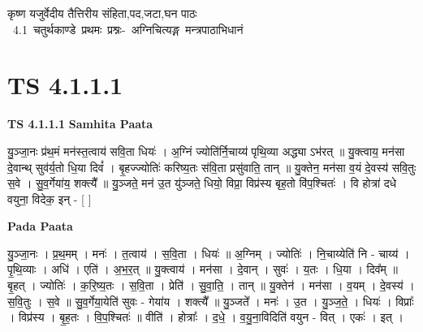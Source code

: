 \documentclass[17pt]{extarticle}
\begin{document}
\begin{titlepage}
    \begin{center}
 
\begin{sanskrit}
    { \Large
    कृष्ण यजुर्वेदीय तैत्तिरीय संहिता,पद,जटा,घन पाठः 
    }
    \\
    \vspace{2.5cm}
    \mbox{ \Large
    4.1     चतुर्थकाण्डे प्रथमः प्रश्नः- अग्निचित्यङ्ग मन्त्रपाठाभिधानं   }
\end{sanskrit}
\end{center}

\end{titlepage}
\tableofcontents
{}
\pagebreak


\section{ TS 4.1.1.1 }

\textbf{TS 4.1.1.1 } \newline
\textbf{Samhita Paata} \newline

यु॒ञ्जा॒नः प्र॑थ॒मं मन॑स्त॒त्वाय॑ सवि॒ता धियः॑ । अ॒ग्निं ज्योति॑र्नि॒चाय्य॑ पृथि॒व्या अद्ध्या ऽभ॑रत् ॥ यु॒क्त्वाय॒ मन॑सा दे॒वान्थ् सुव॑र्य॒तो धि॒या दिवं᳚ । बृ॒हज्ज्योतिः॑ करिष्य॒तः स॑वि॒ता प्रसु॑वाति॒ तान् ॥ यु॒क्तेन॒ मन॑सा व॒यं दे॒वस्य॑ सवि॒तुः स॒वे । सु॒व॒र्गेया॑य॒ शक्त्यै᳚ ॥ यु॒ञ्जते॒ मन॑ उ॒त यु॑ञ्जते॒ धियो॒ विप्रा॒ विप्र॑स्य बृह॒तो वि॑प॒श्चितः॑ । वि होत्रा॑ दधे वयुना॒ विदेक॒ इन् - [  ] \newline

\textbf{Pada Paata} \newline

यु॒ञ्जा॒नः । प्र॒थ॒मम् । मनः॑ । त॒त्वाय॑ । स॒वि॒ता । धियः॑ ॥ अ॒ग्निम् । ज्योतिः॑ । नि॒चाय्येति॑ नि - चाय्य॑ । पृ॒थि॒व्याः । अधि॑ । एति॑ । अ॒भ॒र॒त् ॥ यु॒क्त्वाय॑ । मन॑सा । दे॒वान् । सुवः॑ । य॒तः । धि॒या । दिव᳚म् ॥ बृ॒हत् । ज्योतिः॑ । क॒रि॒ष्य॒तः । स॒वि॒ता । प्रेति॑ । सु॒वा॒ति॒ । तान् ॥ यु॒क्तेन॑ । मन॑सा । व॒यम् । दे॒वस्य॑ । स॒वि॒तुः । स॒वे ॥ सु॒व॒र्गेया॒येति॑ सुवः - गेया॑य । शक्त्यै᳚ ॥ यु॒ञ्जते᳚ । मनः॑ । उ॒त । यु॒ञ्ज॒ते॒ । धियः॑ । विप्राः᳚ । विप्र॑स्य । बृ॒ह॒तः । वि॒प॒श्चितः॑ ॥ वीति॑ । होत्राः᳚ । द॒धे॒ । व॒यु॒ना॒विदिति॑ वयुन - वित् । एकः॑ । इत् ।  \newline




\end{document}
